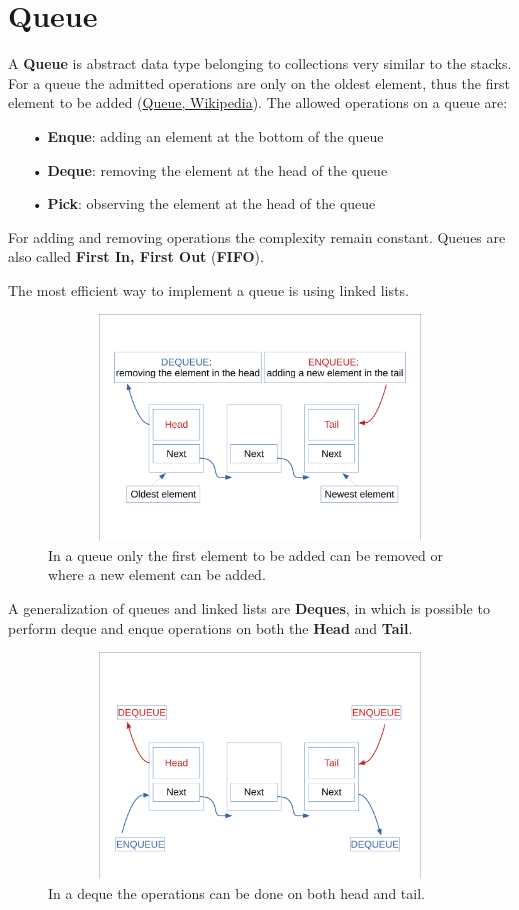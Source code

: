 \section{Queue}
A \textbf{Queue} is abstract data type belonging to collections very similar to the stacks. For a queue the admitted operations are only on the oldest element, thus the first element to be added \cite{wikiqueue} (\href{https://en.wikipedia.org/wiki/Queue_(abstract_data_type)}{Queue, Wikipedia}). The allowed operations on a queue are:
\begin{itemize}
\item[•] \textbf{Enque}: adding an element at the bottom of the queue
\item[•] \textbf{Deque}: removing the element at the head of the queue
\item[•] \textbf{Pick}: observing the element at the head of the queue
\end{itemize}
For adding and removing operations the complexity remain constant. Queues are also called \textbf{First In, First Out} (\textbf{FIFO}). 

The most efficient way to implement a queue is using linked lists.

\begin{figure}[h]
	\includegraphics[width=14cm,height=6cm]{chapters/datastructures/images/queue_1.pdf}
	\caption[]{In a queue only the first element to be added can be removed or where a new element can be added.}
	\label{queue_1}
\end{figure}

A generalization of queues and linked lists are \textbf{Deques}, in which is possible to perform deque and enque operations on both the \textbf{Head} and \textbf{Tail}.

\begin{figure}[h]
	\includegraphics[width=14cm,height=6cm]{chapters/datastructures/images/queue_2.pdf}
	\caption[]{In a deque the operations can be done on both head and tail.}
	\label{queue_2}
\end{figure}

